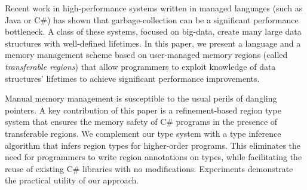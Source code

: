 Recent work in high-performance systems written in managed languages
(such as Java or C\#) has shown that garbage-collection can be a
significant performance bottleneck.  A class of these systems, focused
on big-data, create many large data structures with
well-defined lifetimes.  In this paper, we present a language and a
memory management scheme based on user-managed memory regions (called
\emph{transferable regions}) that allow programmers to exploit
knowledge of data structures' lifetimes to achieve significant
performance improvements.

Manual memory management is susceptible to the usual perils of
dangling pointers. A key contribution of this paper is a
refinement-based region type system that ensures the memory safety of
C\# programs in the presence of transferable regions. We complement
our type system with a type inference algorithm that infers 
region types for higher-order programs. This eliminates the need for programmers to
write region annotations on types, while facilitating the reuse of
existing C\# libraries with no modifications. Experiments demonstrate
the practical utility of our approach.

